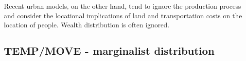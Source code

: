 
Recent urban models, on the other hand, tend to ignore the production process and consider the locational implications of land and transportation costs on the location of people. Wealth distribution is often ignored. 

\subsection{TEMP/MOVE - marginalist distribution}

%

